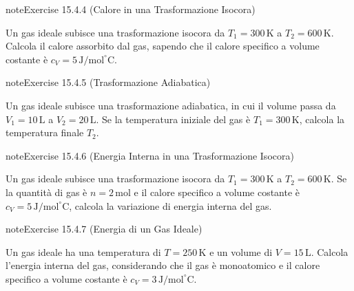 \documentclass[letterpaper,10pt,italian]{jupyterBook}
\begin{document}
\begin{sphinxadmonition}{note}{Exercise 15.4.4 (Calore in una Trasformazione Isocora)}



\sphinxAtStartPar
Un gas ideale subisce una trasformazione isocora da \(T_1 = 300 \, \text{K}\) a \(T_2 = 600 \, \text{K}\). Calcola il calore assorbito dal gas, sapendo che il calore specifico a volume costante è \(c_V = 5 \, \text{J/mol}^\circ \text{C}\).
\end{sphinxadmonition}
 \label{exercise:ch/thermodynamics/matter-problems-exercise-4}

\begin{sphinxadmonition}{note}{Exercise 15.4.5 (Trasformazione Adiabatica)}



\sphinxAtStartPar
Un gas ideale subisce una trasformazione adiabatica, in cui il volume passa da \(V_1 = 10 \, \text{L}\) a \(V_2 = 20 \, \text{L}\). Se la temperatura iniziale del gas è \(T_1 = 300 \, \text{K}\), calcola la temperatura finale \(T_2\).
\end{sphinxadmonition}
 \label{exercise:ch/thermodynamics/matter-problems-exercise-5}

\begin{sphinxadmonition}{note}{Exercise 15.4.6 (Energia Interna in una Trasformazione Isocora)}



\sphinxAtStartPar
Un gas ideale subisce una trasformazione isocora da \(T_1 = 300 \, \text{K}\) a \(T_2 = 600 \, \text{K}\). Se la quantità di gas è \(n = 2 \, \text{mol}\) e il calore specifico a volume costante è \(c_V = 5 \, \text{J/mol}^\circ \text{C}\), calcola la variazione di energia interna del gas.
\end{sphinxadmonition}
 \label{exercise:ch/thermodynamics/matter-problems-exercise-6}

\begin{sphinxadmonition}{note}{Exercise 15.4.7 (Energia di un Gas Ideale)}



\sphinxAtStartPar
Un gas ideale ha una temperatura di \(T = 250 \, \text{K}\) e un volume di \(V = 15 \, \text{L}\). Calcola l’energia interna del gas, considerando che il gas è monoatomico e il calore specifico a volume costante è \(c_V = 3 \, \text{J/mol}^\circ \text{C}\).
\end{sphinxadmonition}
 \label{exercise:ch/thermodynamics/matter-problems-exercise-7}
\end{document}
